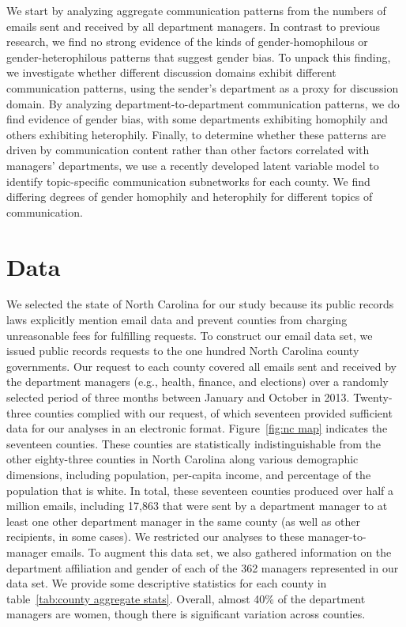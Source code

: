 \documentclass{pnastwo}
\begin{document}
\begin{article}
We start by analyzing aggregate communication patterns from the
numbers of emails sent and received by all department managers. In
contrast to previous research, we find no strong evidence of the kinds
of gender-homophilous or gender-heterophilous patterns that suggest
gender bias. To unpack this finding, we investigate whether different
discussion domains exhibit different communication patterns, using the
sender's department as a proxy for discussion domain. By analyzing
department-to-department communication patterns, we do find evidence
of gender bias, with some departments exhibiting homophily and others
exhibiting heterophily. Finally, to determine whether these patterns
are driven by communication content rather than other factors
correlated with managers' departments, we use a recently developed
latent variable model to identify topic-specific communication
subnetworks for each county. We find differing degrees of gender
homophily and heterophily for different topics of communication.


\section{Data}

We selected the state of North Carolina for our study because its
public records laws explicitly mention email data and prevent counties
from charging unreasonable fees for fulfilling requests. To construct
our email data set, we issued public records requests to the one
hundred North Carolina county governments. Our request to each county
covered all emails sent and received by the department managers (e.g.,
health, finance, and elections) over a randomly selected period of
three months between January and October in 2013. Twenty-three
counties complied with our request, of which seventeen provided
sufficient data for our analyses in an electronic
format. Figure~\ref{fig:nc map} indicates the seventeen
counties. These counties are statistically indistinguishable from
the other eighty-three counties in North Carolina along various
demographic dimensions, including population, per-capita income, and
percentage of the population that is white. In total, these seventeen
counties produced over half a million emails, including 17,863 that
were sent by a department manager to at least one other department
manager in the same county (as well as other recipients, in some
cases). We restricted our analyses to these manager-to-manager
emails. To augment this data set, we also gathered information on the
department affiliation and gender of each of the 362 managers
represented in our data set. We provide some descriptive statistics
for each county in table~\ref{tab:county aggregate stats}. Overall,
almost 40\% of the department managers are women, though there is
significant variation across counties.


\end{article}
\end{document}
